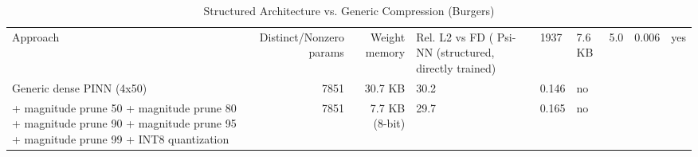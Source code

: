 \begin{table}[htbp]
\centering
\caption{Structured Architecture vs. Generic Compression (Burgers)}
\label{tab:compress}
\begin{tabular}{lrrll}
\hline
Approach & Distinct/Nonzero params & Weight memory & Rel. L2 vs FD (%
\hline
Psi-NN (structured, directly trained) & 1937 & 7.6 KB & 5.0 & 0.006 & yes \\
Generic dense PINN (4x50) & 7851 & 30.7 KB & 30.2 & 0.146 & no \\
  + magnitude prune 50%
  + magnitude prune 80%
  + magnitude prune 90%
  + magnitude prune 95%
  + magnitude prune 99%
  + INT8 quantization & 7851 & 7.7 KB (8-bit) & 29.7 & 0.165 & no \\
\hline
\end{tabular}
\end{table}
